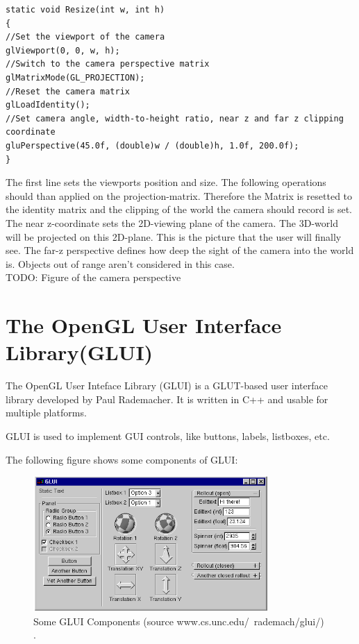 \documentclass[10pt,a4paper,DIV=11]{scrreprt}
\begin{document}
\begin{lstlisting}[caption={Resize camera perspective on window resize},label=lst:glut-resize]
static void Resize(int w, int h)
{
//Set the viewport of the camera
glViewport(0, 0, w, h);
//Switch to the camera perspective matrix
glMatrixMode(GL_PROJECTION); 
//Reset the camera matrix
glLoadIdentity();
//Set camera angle, width-to-height ratio, near z and far z clipping coordinate
gluPerspective(45.0f, (double)w / (double)h, 1.0f, 200.0f);
}
\end{lstlisting}

The first line sets the viewports position and size. The following operations should than applied on the projection-matrix. Therefore the Matrix is resetted to the identity matrix and the clipping of the world the camera should record is set. The near z-coordinate sets the 2D-viewing plane of the camera. The 3D-world will be projected on this 2D-plane. This is the picture that the user will finally see. The far-z perspective defines how deep the sight of the camera into the world is. Objects out of range aren't considered in this case. \\

TODO: Figure of the camera perspective

\section{The OpenGL User Interface Library(GLUI)}
The OpenGL User Inteface Library (GLUI) is a GLUT-based user interface library developed by Paul Rademacher. It is written in C++ and usable for multiple platforms.

GLUI is used to implement GUI controls, like buttons, labels, listboxes, etc.

The following figure shows some components of GLUI:

\begin{center}
	\begin{figure}[H]
		\centering
		\includegraphics[width=0.8\textwidth,scale=1.0]{files/glui.png}  
		\caption{Some GLUI Components (source www.cs.unc.edu/~rademach/glui/) \cite{ogl-glui}.}
		\label{fig:ogl-glui}
	\end{figure}
\end{center}
\end{document}
